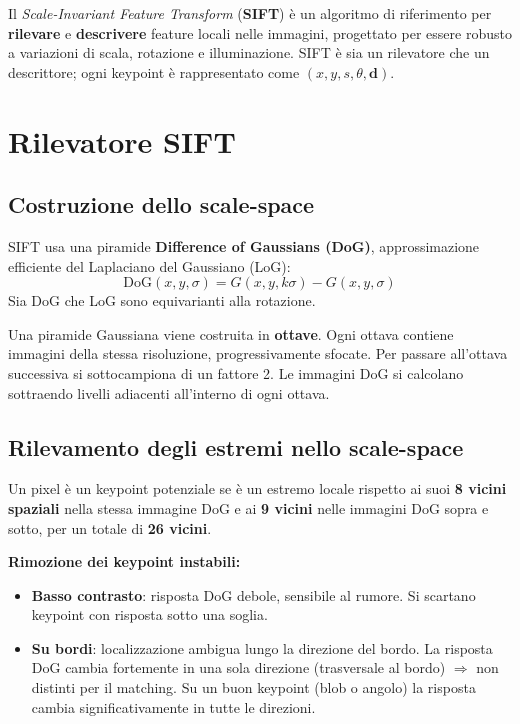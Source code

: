 \documentclass[12pt, a4paper]{report}
\begin{document}
Il \textit{Scale-Invariant Feature Transform} (\textbf{SIFT}) è un algoritmo di
riferimento per \textbf{rilevare} e \textbf{descrivere} feature locali nelle
immagini, progettato per essere robusto a variazioni di scala, rotazione e
illuminazione. SIFT è sia un rilevatore che un descrittore; ogni keypoint è
rappresentato come $(x,y,s,\theta,\mathbf{d})$.

\section{Rilevatore SIFT}

\subsection{Costruzione dello scale-space}

SIFT usa una piramide \textbf{Difference of Gaussians (DoG)}, approssimazione
efficiente del Laplaciano del Gaussiano (LoG):
\[
  \mathrm{DoG}(x,y,\sigma) = G(x,y,k\sigma)-G(x,y,\sigma)
\]
Sia DoG che LoG sono equivarianti alla rotazione.

Una piramide Gaussiana viene costruita in \textbf{ottave}. Ogni ottava contiene
immagini della stessa risoluzione, progressivamente sfocate. Per passare
all'ottava successiva si sottocampiona di un fattore 2. Le immagini DoG si
calcolano sottraendo livelli adiacenti all'interno di ogni ottava.

\subsection{Rilevamento degli estremi nello scale-space}

Un pixel è un keypoint potenziale se è un estremo locale rispetto ai suoi
\textbf{8 vicini spaziali} nella stessa immagine DoG e ai \textbf{9 vicini}
nelle immagini DoG sopra e sotto, per un totale di \textbf{26 vicini}.

\textbf{Rimozione dei keypoint instabili:}
\begin{itemize}
  \item \textbf{Basso contrasto}: risposta DoG debole, sensibile al rumore.
        Si scartano keypoint con risposta sotto una soglia.
  \item \textbf{Su bordi}: localizzazione ambigua lungo la direzione del bordo.
        La risposta DoG cambia fortemente in una sola direzione (trasversale al
        bordo) $\Rightarrow$ non distinti per il matching. Su un buon keypoint
        (blob o angolo) la risposta cambia significativamente in tutte le direzioni.
\end{itemize}
\end{document}
